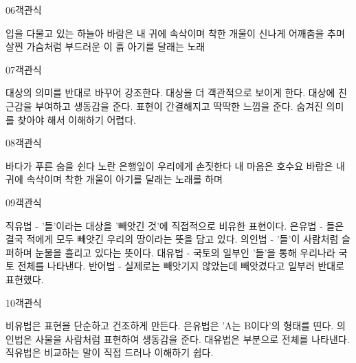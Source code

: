\documentclass[fs85,seriesRus]{korfarm-base}
\begin{document}
\begin{kfQBlock}{06}{객관식}
\begin{kfChoices}
\kfChoice 입을 다물고 있는 하늘아
\kfChoice 바람은 내 귀에 속삭이며
\kfChoice 착한 개울이 신나게 어깨춤을 추며
\kfChoice 살찐 가슴처럼 부드러운 이 흙
\kfChoice 아기를 달래는 노래
\end{kfChoices}
\end{kfQBlock}
\begin{kfQBlock}{07}{객관식}
\begin{kfChoices}
\kfChoice 대상의 의미를 반대로 바꾸어 강조한다.
\kfChoice 대상을 더 객관적으로 보이게 한다.
\kfChoice 대상에 친근감을 부여하고 생동감을 준다.
\kfChoice 표현이 간결해지고 딱딱한 느낌을 준다.
\kfChoice 숨겨진 의미를 찾아야 해서 이해하기 어렵다.
\end{kfChoices}
\end{kfQBlock}
\begin{kfQBlock}{08}{객관식}
\begin{kfChoices}
\kfChoice 바다가 푸른 숨을 쉰다
\kfChoice 노란 은행잎이 우리에게 손짓한다
\kfChoice 내 마음은 호수요
\kfChoice 바람은 내 귀에 속삭이며
\kfChoice 착한 개울이 아기를 달래는 노래를 하며
\end{kfChoices}
\end{kfQBlock}
\begin{kfQBlock}{09}{객관식}
\begin{kfChoices}
\kfChoice 직유법 - '들'이라는 대상을 '빼앗긴 것'에 직접적으로 비유한 표현이다.
\kfChoice 은유법 - 들은 결국 적에게 모두 빼앗긴 우리의 땅이라는 뜻을 담고 있다.
\kfChoice 의인법 - '들'이 사람처럼 슬퍼하며 눈물을 흘리고 있다는 뜻이다.
\kfChoice 대유법 - 국토의 일부인 '들'을 통해 우리나라 국토 전체를 나타낸다.
\kfChoice 반어법 - 실제로는 빼앗기지 않았는데 빼앗겼다고 일부러 반대로 표현했다.
\end{kfChoices}
\end{kfQBlock}
\begin{kfQBlock}{10}{객관식}
\begin{kfChoices}
\kfChoice 비유법은 표현을 단순하고 건조하게 만든다.
\kfChoice 은유법은 'A는 B이다'의 형태를 띤다.
\kfChoice 의인법은 사물을 사람처럼 표현하여 생동감을 준다.
\kfChoice 대유법은 부분으로 전체를 나타낸다.
\kfChoice 직유법은 비교하는 말이 직접 드러나 이해하기 쉽다.
\end{kfChoices}
\end{kfQBlock}
\end{document}
